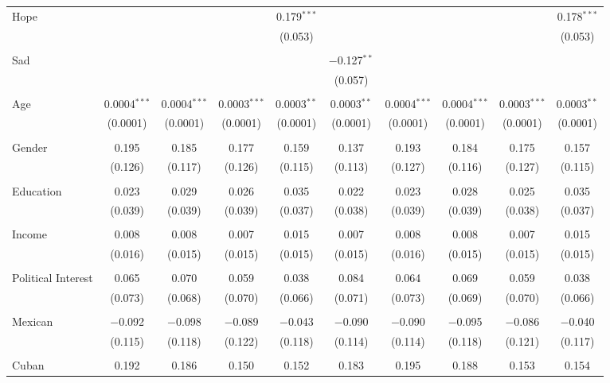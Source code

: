 \begin{table}[!htbp]
\begin{tabular}{@{\extracolsep{5pt}}lccccccccc}
 Hope &  &  &  & 0.179$^{***}$ &  &  &  &  & 0.178$^{***}$ \\ 
  &  &  &  & (0.053) &  &  &  &  & (0.053) \\ 
  & & & & & & & & & \\ 
 Sad &  &  &  &  & $-$0.127$^{**}$ &  &  &  &  \\ 
  &  &  &  &  & (0.057) &  &  &  &  \\ 
  & & & & & & & & & \\ 
 Age & 0.0004$^{***}$ & 0.0004$^{***}$ & 0.0003$^{***}$ & 0.0003$^{**}$ & 0.0003$^{**}$ & 0.0004$^{***}$ & 0.0004$^{***}$ & 0.0003$^{***}$ & 0.0003$^{**}$ \\ 
  & (0.0001) & (0.0001) & (0.0001) & (0.0001) & (0.0001) & (0.0001) & (0.0001) & (0.0001) & (0.0001) \\ 
  & & & & & & & & & \\ 
 Gender & 0.195 & 0.185 & 0.177 & 0.159 & 0.137 & 0.193 & 0.184 & 0.175 & 0.157 \\ 
  & (0.126) & (0.117) & (0.126) & (0.115) & (0.113) & (0.127) & (0.116) & (0.127) & (0.115) \\ 
  & & & & & & & & & \\ 
 Education & 0.023 & 0.029 & 0.026 & 0.035 & 0.022 & 0.023 & 0.028 & 0.025 & 0.035 \\ 
  & (0.039) & (0.039) & (0.039) & (0.037) & (0.038) & (0.039) & (0.039) & (0.038) & (0.037) \\ 
  & & & & & & & & & \\ 
 Income & 0.008 & 0.008 & 0.007 & 0.015 & 0.007 & 0.008 & 0.008 & 0.007 & 0.015 \\ 
  & (0.016) & (0.015) & (0.015) & (0.015) & (0.015) & (0.016) & (0.015) & (0.015) & (0.015) \\ 
  & & & & & & & & & \\ 
 Political Interest & 0.065 & 0.070 & 0.059 & 0.038 & 0.084 & 0.064 & 0.069 & 0.059 & 0.038 \\ 
  & (0.073) & (0.068) & (0.070) & (0.066) & (0.071) & (0.073) & (0.069) & (0.070) & (0.066) \\ 
  & & & & & & & & & \\ 
 Mexican & $-$0.092 & $-$0.098 & $-$0.089 & $-$0.043 & $-$0.090 & $-$0.090 & $-$0.095 & $-$0.086 & $-$0.040 \\ 
  & (0.115) & (0.118) & (0.122) & (0.118) & (0.114) & (0.114) & (0.118) & (0.121) & (0.117) \\ 
  & & & & & & & & & \\ 
 Cuban & 0.192 & 0.186 & 0.150 & 0.152 & 0.183 & 0.195 & 0.188 & 0.153 & 0.154 \\ 

\end{tabular}
\end{table}
